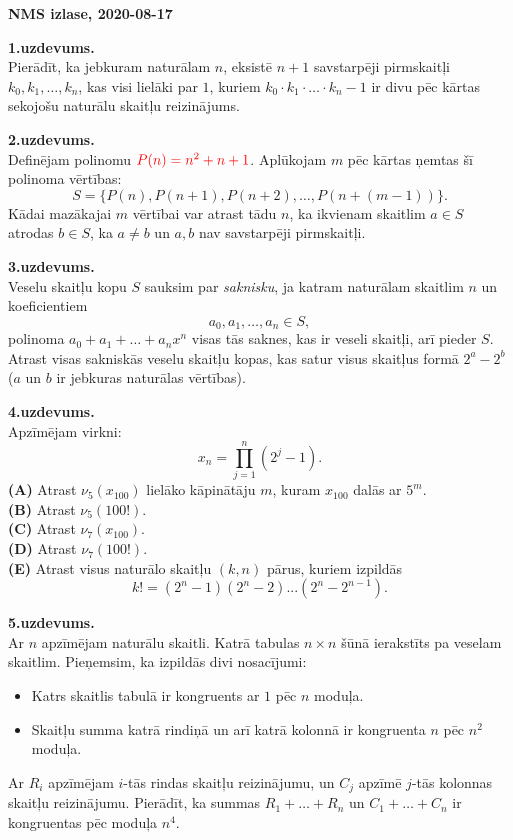 \documentclass[a4paper]{article}
\begin{document}

\twocolumn

{\Large \bf NMS izlase, 2020-08-17}

\vspace{4pt}
{\bf 1.uzdevums.}\\
Pierādīt, ka jebkuram naturālam $n$, eksistē $n+1$ 
savstarpēji pirmskaitļi $k_0,k_1,\ldots,k_n$, kas visi lielāki par $1$, kuriem 
$k_0 \cdot k_1 \cdot \ldots \cdot k_n - 1$
ir divu pēc kārtas sekojošu naturālu skaitļu reizinājums.



\vspace{4pt}
{\bf 2.uzdevums.}\\
Definējam polinomu $\textcolor{red}{P(n)=n^2+n+1}$. 
Aplūkojam $m$ pēc kārtas ņemtas šī polinoma vērtības:
$$S = \{P(n),P(n + 1),P(n + 2),\ldots,P(n+(m-1))\}.$$ 
Kādai mazākajai $m$ vērtībai var atrast tādu $n$, ka 
ikvienam skaitlim $a \in S$ atrodas $b \in S$, ka $a \neq b$ 
un $a,b$ nav savstarpēji pirmskaitļi. 



\vspace{10pt}
{\bf 3.uzdevums.}\\
Veselu skaitļu kopu $S$ sauksim par {\em saknisku}, ja
kat\-ram naturālam skaitlim $n$ un koeficientiem 
$$a_0,a_1,\ldots,a_n \in S,$$ 
polinoma $a_0 + a_1 + \ldots + a_n x^n$
visas tās saknes, kas ir veseli skaitļi, arī pieder $S$. 
Atrast visas sakniskās veselu skaitļu kopas, kas satur visus skaitļus
formā $2^a - 2^b$ ($a$ un $b$ ir jebkuras naturālas vērtības).


\vspace{10pt}
{\bf 4.uzdevums.}\\
Apzīmējam virkni: 
$$x_n = \prod\limits_{j=1}^{n} \left(2^j - 1 \right).$$
{\bf (A)} Atrast $\nu_5 \left( x_{100} \right)$ \textendash{} lielāko 
kāpinātāju $m$, kuram $x_{100}$ dalās ar $5^m$.\\
{\bf (B)} Atrast $\nu_5 (100!)$.\\
{\bf (C)} Atrast $\nu_7 (x_{100})$.\\
{\bf (D)} Atrast $\nu_7 (100!)$.\\
{\bf (E)} Atrast visus naturālo skaitļu $(k,n)$ pārus, kuriem izpildās
$$k! = (2^n - 1)(2^n - 2)...(2^n - 2^{n-1}).$$


\vspace{10pt}
{\bf 5.uzdevums.}\\
Ar $n$ apzīmējam naturālu skaitli. 
Katrā tabulas $n \times n$ šūnā ierakstīts pa veselam skaitlim. 
Pieņemsim, ka izpildās divi nosacījumi:
\begin{itemize}
\item 
Katrs skaitlis tabulā ir kongruents ar $1$ pēc $n$ moduļa. 
\item 
Skaitļu summa katrā rindiņā un arī katrā kolon\-nā ir kongruenta $n$ pēc
$n^2$ moduļa. 
\end{itemize}
Ar $R_i$ apzīmējam $i$-tās rindas skaitļu reizinājumu, un 
$C_j$ apzīmē $j$-tās kolonnas skaitļu reizinājumu. 
Pierādīt, ka summas $R_1 + \ldots + R_n$ un 
$C_1 + \ldots + C_n$ ir kongruentas pēc moduļa $n^4$.
\end{document}
